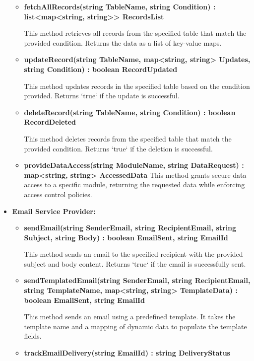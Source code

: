 \begin{itemize}
\begin{itemize}
\item \textbf{fetchAllRecords(string TableName, string Condition) : list<map<string, string>> RecordsList} 

This method retrieves all records from the specified table that match the provided condition. Returns the data as a list of key-value maps.

\item \textbf{updateRecord(string TableName, map<string, string> Updates, string Condition) : boolean RecordUpdated}  

This method updates records in the specified table based on the condition provided. Returns `true` if the update is successful.

\item \textbf{deleteRecord(string TableName, string Condition) : boolean RecordDeleted}  

This method deletes records from the specified table that match the provided condition. Returns `true` if the deletion is successful.

\item \textbf{provideDataAccess(string ModuleName, string DataRequest) : map<string, string> AccessedData}  
This method grants secure data access to a specific module, returning the requested data while enforcing access control policies.

\end{itemize}

\item \textbf{Email Service Provider: }
\begin{itemize}
\item \textbf{sendEmail(string SenderEmail, string RecipientEmail, string Subject, string Body) : boolean EmailSent, string EmailId} 

This method sends an email to the specified recipient with the provided subject and body content. Returns `true` if the email is successfully sent.

\item \textbf{sendTemplatedEmail(string SenderEmail, string RecipientEmail, string TemplateName, map<string, string> TemplateData) : boolean EmailSent, string EmailId}  

This method sends an email using a predefined template. It takes the template name and a mapping of dynamic data to populate the template fields.

\item \textbf{trackEmailDelivery(string EmailId) : string DeliveryStatus} 


\end{itemize}
\end{itemize}
